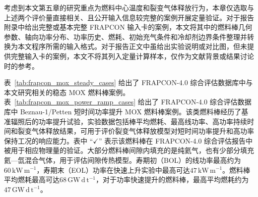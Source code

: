 考虑到本文第五章的研究重点为燃料中心温度和裂变气体释放行为，本章仅选取与上述两个评价量直接相关、且公开输入信息较完整的案例开展定量验证。对于报告附录中给出完整或基本完整 FRAPCON 输入卡的案例，本文将其中的燃料棒几何参数、轴向功率分布、功率历史、燃耗、初始充气条件和冷却剂边界条件整理并转换为本文程序所需的输入格式。对于报告正文中虽给出实验说明或对比图，但未提供完整输入卡的案例，本文不将其列入定量计算样本，仅作为文献背景或结果讨论时的参考。

表~\ref{tab:frapcon_mox_steady_cases} 给出了 FRAPCON-4.0 综合评估数据库中与本文研究相关的稳态 MOX 燃料棒案例。表~\ref{tab:frapcon_mox_power_ramp_cases} 给出了 FRAPCON-4.0 综合评估数据库中 Beznau-1/Petten 短时间功率提升 MOX 燃料棒案例\cite{ML16118A434}。该类燃料棒经历了基准辐照后的功率提升试验，实验数据包括棒平均燃耗、最高线功率、高功率持续时间和裂变气体释放结果，可用于评价裂变气体释放模型对短时间功率提升和高功率保持工况的响应能力。表中 ``$\checkmark$'' 表示该燃料棒在 FRAPCON-4.0 综合评估报告中被用于相应物理量的验证。大部分燃料棒间隙内填充的是纯氦气，也有少部分填充氦—氙混合气体，用于评估间隙传热模型。寿期初（BOL）的线功率最高约为$60\,\mathrm{kW\,m^{-1}}$，寿期末（EOL）功率在快速上升实验中最高可达$47\,\mathrm{kW\,m^{-1}}$。燃料棒平均燃耗最高可达$68\,\mathrm{GW\,d\,t^{-1}}$，对于功率快速提升的燃料棒，最高平均燃耗约为$47\,\mathrm{GW\,d\,t^{-1}}$。

